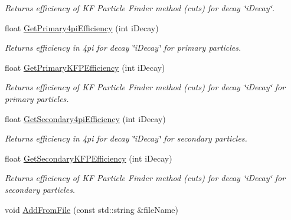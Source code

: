 \begin{DoxyCompactItemize}
\begin{DoxyCompactList}\small\item\em Returns efficiency of KF Particle Finder method (cuts) for decay \char`\"{}i\+Decay\char`\"{}. \end{DoxyCompactList}\item 
float \hyperlink{classKFPartEfficiencies_a19d7eac2141c53c0488d7f6f74b77efe}{Get\+Primary4pi\+Efficiency} (int i\+Decay)\hypertarget{classKFPartEfficiencies_a19d7eac2141c53c0488d7f6f74b77efe}{}\label{classKFPartEfficiencies_a19d7eac2141c53c0488d7f6f74b77efe}

\begin{DoxyCompactList}\small\item\em Returns efficiency in 4pi for decay \char`\"{}i\+Decay\char`\"{} for primary particles. \end{DoxyCompactList}\item 
float \hyperlink{classKFPartEfficiencies_afb1242e78db7e1132a850b3efc534c7f}{Get\+Primary\+K\+F\+P\+Efficiency} (int i\+Decay)\hypertarget{classKFPartEfficiencies_afb1242e78db7e1132a850b3efc534c7f}{}\label{classKFPartEfficiencies_afb1242e78db7e1132a850b3efc534c7f}

\begin{DoxyCompactList}\small\item\em Returns efficiency of KF Particle Finder method (cuts) for decay \char`\"{}i\+Decay\char`\"{} for primary particles. \end{DoxyCompactList}\item 
float \hyperlink{classKFPartEfficiencies_a3ae8747e495793f9af5c9e2365f09172}{Get\+Secondary4pi\+Efficiency} (int i\+Decay)\hypertarget{classKFPartEfficiencies_a3ae8747e495793f9af5c9e2365f09172}{}\label{classKFPartEfficiencies_a3ae8747e495793f9af5c9e2365f09172}

\begin{DoxyCompactList}\small\item\em Returns efficiency in 4pi for decay \char`\"{}i\+Decay\char`\"{} for secondary particles. \end{DoxyCompactList}\item 
float \hyperlink{classKFPartEfficiencies_a52c037d748cf6676c9c7d9aab71f9a0d}{Get\+Secondary\+K\+F\+P\+Efficiency} (int i\+Decay)\hypertarget{classKFPartEfficiencies_a52c037d748cf6676c9c7d9aab71f9a0d}{}\label{classKFPartEfficiencies_a52c037d748cf6676c9c7d9aab71f9a0d}

\begin{DoxyCompactList}\small\item\em Returns efficiency of KF Particle Finder method (cuts) for decay \char`\"{}i\+Decay\char`\"{} for secondary particles. \end{DoxyCompactList}\item 
void \hyperlink{classKFPartEfficiencies_ae4a38efd79dd905f6d0e82062ce4a966}{Add\+From\+File} (const std\+::string \&file\+Name)\hypertarget{classKFPartEfficiencies_ae4a38efd79dd905f6d0e82062ce4a966}{}\label{classKFPartEfficiencies_ae4a38efd79dd905f6d0e82062ce4a966}


\end{DoxyCompactItemize}
